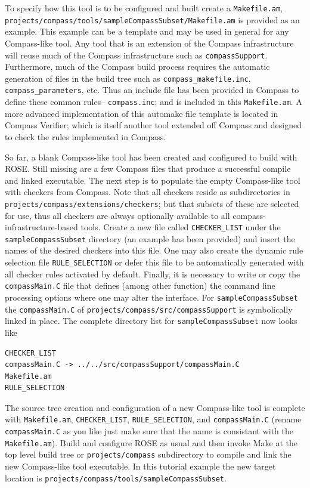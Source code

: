 \vspace{0.2in}

To specify how this tool is to be configured and built create a 
{\tt Makefile.am},
{\tt projects/compass/tools/sampleCompassSubset/Makefile.am} is provided as an 
example.
This example can be a template and may be used in general for any Compass-like 
tool.
Any tool that is an extension of the Compass infrastructure will reuse much of 
the Compass infrastructure such as {\tt compassSupport}.
Furthermore, much of the Compass build
process requires the automatic generation of files in the build tree such
as {\tt compass\_makefile.inc}, {\tt compass\_parameters}, etc. Thus an
include file has been provided in Compass to define these common rules--
{\tt compass.inc}; and is included in this {\tt Makefile.am}.
A more advanced implementation of this automake file template is located in
Compass Verifier; which is itself another tool extended off Compass and
designed to check the rules implemented in Compass.

So far, a blank Compass-like tool has been created and configured to build with
ROSE. Still missing are a few Compass files that produce a successful
compile and linked executable. The next step is to populate the empty 
Compass-like tool with checkers from Compass. Note that all checkers
reside as subdirectories in {\tt projects/compass/extensions/checkers};
but that subsets of
these are selected for use, thus all checkers are always optionally available 
to all compass-infrastructure-based tools.  Create a new file called
{\tt CHECKER\_LIST} under the {\tt sampleCompassSubset} directory (an
example has been provided) and insert the names of the desired checkers into
this file. One may also create the dynamic rule selection file 
{\tt RULE\_SELECTION} or defer this file to be automatically generated with
all checker rules activated by default. Finally, it is necessary to write or
copy the {\tt compassMain.C} file that defines (among other function)
the command line processing options where one may alter the interface. 
For {\tt sampleCompassSubset} the {\tt compassMain.C} of 
{\tt projects/compass/src/compassSupport} 
is symbolically linked in place. The complete directory list for 
{\tt sampleCompassSubset} now looks like

\begin{verbatim}
CHECKER_LIST
compassMain.C -> ../../src/compassSupport/compassMain.C
Makefile.am
RULE_SELECTION
\end{verbatim}

The source tree creation and configuration of a new Compass-like tool is 
complete with {\tt Makefile.am}, {\tt CHECKER\_LIST}, {\tt RULE\_SELECTION},
and {\tt compassMain.C} (rename {\tt compassMain.C} as you like just make
sure that the name is consistant with the {\tt Makefile.am}). Build and 
configure ROSE as usual and then invoke Make at the top level build tree 
or {\tt projects/compass} subdirectory to
compile and link the new Compass-like tool executable. In this tutorial 
example the new target location is 
{\tt projects/compass/tools/sampleCompassSubset}.
